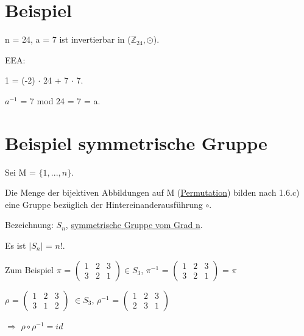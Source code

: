 \documentclass[a4paper, openany]{book}
\begin{document}
  \section{Beispiel}

  n = 24, a = 7 ist invertierbar in ($\mathbb{Z}_{24}, \odot$). 

  EEA:

  1 = (-2) $\cdot$ 24 + 7 $\cdot$ 7.

  $a^{-1}$ = 7 mod 24 = 7 = a.

  \section{Beispiel symmetrische Gruppe}

  Sei M = $\{1,...,n\}$.

  Die Menge der bijektiven Abbildungen auf M (\underline{Permutation}) bilden nach 1.6.c) eine Gruppe bezüglich der Hintereinanderausführung $\circ$.

  \par \medskip

  Bezeichnung: $S_n$, \underline{symmetrische Gruppe vom Grad n}.

  Es ist $|S_n|$ = $n!$.

  Zum Beispiel $\pi$ = $\begin{pmatrix}
                          1 & 2 & 3  \\
                          3 & 2 & 1 
                        \end{pmatrix} \in S_3$,  $\pi^{-1}$ = $\begin{pmatrix}
                                                               1 & 2 & 3 \\
                                                               3 & 2 & 1 
                                                            \end{pmatrix}$ = $\pi$

  
  $\rho$ = $\begin{pmatrix} 1 & 2 & 3 \\ 3 & 1 & 2 \end{pmatrix}$ $\in S_3$, $\rho^{-1}$ = $\begin{pmatrix} 1 & 2 & 3 \\ 2 & 3 & 1 \end{pmatrix}$

  $\Rightarrow$ $\rho \circ \rho^{-1} = id$

  \par \medskip
\end{document}
